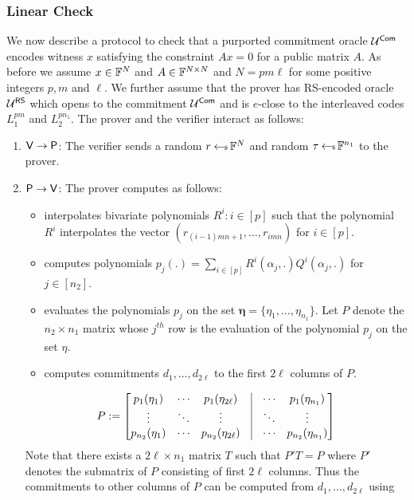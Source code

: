 \subsubsection{Linear Check}
We now describe a protocol to check that a purported commitment oracle
$\mathcal{U}^{\mathsf{Com}}$ encodes witness $x$ satisfying the constraint $Ax=0$ for a public
matrix $A$. As before we assume $x\in \mathbb{F}^N$ and $A\in \mathbb{F}^{N\times N}$ and
$N=pm\ell$ for some positive integers $p,m$ and $\ell$. We further assume that
the prover has RS-encoded oracle $\mathcal{U}^{\mathsf{RS}}$ which opens to the commitment
$\mathcal{U}^{\mathsf{Com}}$ and is $e$-close to the interleaved codes $L_1^{pm}$ and
$L_2^{pn_1}$. The prover and the verifier interact as follows:
\begin{enumerate}[{\rm 1.}]
\item $\mathsf{V}\rightarrow\mathsf{P}$: The verifier sends a random $r\hskip2.3pt{\gets\!\!\mbox{\tiny${\$}$\normalsize}}\,
\mathbb{F}^N$ and random $\tau\hskip2.3pt{\gets\!\!\mbox{\tiny${\$}$\normalsize}}\, \mathbb{F}^{n_1}$ to the prover.
\item $\mathsf{P}\rightarrow\mathsf{V}$: The prover computes as follows:
\begin{itemize}
\item interpolates bivariate polynomials $R^i:i\in [p]$ such that the polynomial $R^i$ interpolates the
vector $(r_{(i-1)mn+1},\ldots,r_{imn})$ for $i\in [p]$. 
\item computes polynomials $p_j(.)=\sum_{i\in [p]}R^i(\alpha_j,.)Q^i(\alpha_j,.)$ for
$j\in [n_2]$. 
\item evaluates the polynomials $p_j$ on the set
$\bm{\eta}=\{\eta_1,\ldots,\eta_{n_1}\}$. Let $P$ denote the $n_2\times n_1$
matrix whose $j^{th}$ row is the evaluation of the polynomial $p_j$ on the set
$\eta$. 
\item computes commitments $d_1,\ldots,d_{2\ell}$ to the first
$2\ell$ columns of $P$.
\end{itemize}
\begin{equation}
P := \begin{bmatrix}
p_1(\eta_1) & \cdots & p_1(\eta_{2\ell}) & \vline & \cdots &
p_1(\eta_{n_1}) \\
\vdots & \ddots & \vdots & \vline & \ddots & \vdots \\
p_{n_2}(\eta_1) & \cdots & p_{n_2}(\eta_{2\ell}) & \vline & \cdots &
p_{n_2}(\eta_{n_1})
\end{bmatrix}
\end{equation}
Note that there exists a $2\ell\times n_1$ matrix $T$ such that $P'T = P$ where $P'$ denotes
the submatrix of $P$ consisting of first $2\ell$ columns. Thus the commitments
to other columns of $P$ can be computed from $d_1,\ldots,d_{2\ell}$ using

\end{enumerate}
